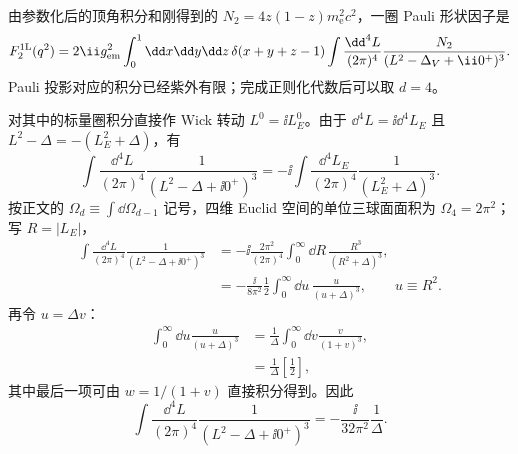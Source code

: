 \begin{derivation}

由参数化后的顶角积分和刚得到的 $N_2=4z(1-z)m_{\mathrm e}^2c^2$，一圈 Pauli 形状因子是
\begin{equation*}
 F_2^{\rm 1L}(q^2)
 =2\ii g_{\rm em}^2
 \int_0^1\dd x\dd y\dd z\,
 \delta(x+y+z-1)
 \int\frac{\dd^4 L}{(2\pi)^4}
 \frac{N_2}{(L^2-\Delta_V+\ii0^+)^3}.
 \end{equation*}
Pauli 投影对应的积分已经紫外有限；完成正则化代数后可以取 $d=4$。

对其中的标量圈积分直接作 Wick 转动 $L^0=\ii L_E^0$。由于 $\dd^4 L=\ii\dd^4 L_E$ 且 $L^2-\Delta=-(L_E^2+\Delta)$，有
\begin{equation*}
 \int\frac{\dd^4 L}{(2\pi)^4}\frac1{(L^2-\Delta+\ii0^+)^3}
 =-\ii\int\frac{\dd^4 L_E}{(2\pi)^4}\frac1{(L_E^2+\Delta)^3}.
\end{equation*}
按正文的 $\Omega_d\equiv\int\dd\Omega_{d-1}$ 记号，四维 Euclid 空间的单位三球面面积为 $\Omega_4=2\pi^2$；写 $R=|L_E|$，
\begin{align*}
 \int\frac{\dd^4 L}{(2\pi)^4}\frac1{(L^2-\Delta+\ii0^+)^3}
 &=-\ii\frac{2\pi^2}{(2\pi)^4}
 \int_0^\infty\dd R\,
 \frac{R^3}{(R^2+\Delta)^3},\\
 &=-\frac{\ii}{8\pi^2}\frac12
 \int_0^\infty\dd u\,
 \frac{u}{(u+\Delta)^3},
 \qquad u\equiv R^2.
\end{align*}
再令 $u=\Delta v$：
\begin{align*}
 \int_0^\infty\dd u\frac{u}{(u+\Delta)^3}
 &=\frac1\Delta
 \int_0^\infty\dd v\frac{v}{(1+v)^3},\\
 &=\frac1\Delta
 \left[\frac12\right],
\end{align*}
其中最后一项可由 $w=1/(1+v)$ 直接积分得到。因此
\begin{equation*}
 {
 \int\frac{\dd^4 L}{(2\pi)^4}\frac1{(L^2-\Delta+\ii0^+)^3}
 =-\frac{\ii}{32\pi^2}\frac1\Delta.}
 \end{equation*}


\end{derivation}
